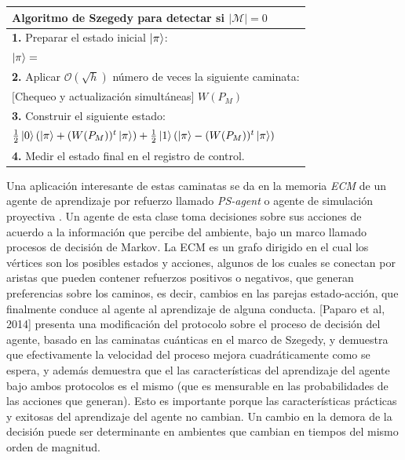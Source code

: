 \begin{center}
    \begin{tabular}{l}
    \hline \textbf{Algoritmo de Szegedy} para detectar \textbf{si $|\mathcal{M}|=0$}\\\hline 
    \textbf{1.} Preparar el estado inicial $\ket{\pi}$:\\
    $\ket{\pi}=$\\
    \textbf{2.} Aplicar $\mathcal{O}(\sqrt{h})$ número de veces la siguiente caminata:\\
    $[$Chequeo y actualización simultáneas$]$ $W(P_M)$\\
    \textbf{3.} Construir el siguiente estado:\\
    $\frac{1}{2}\ket{0}(\ket{\pi}+(W(P_M))^t\ket{\pi})+\frac{1}{2}\ket{1}(\ket{\pi}-(W(P_M))^t\ket{\pi})$\\
    \textbf{4.} Medir el estado final en el registro de control.\\\hline
    \end{tabular}{}
\end{center}{}

Una aplicación interesante de estas caminatas se da en la memoria \textit{ECM} de un agente de aprendizaje por refuerzo llamado \textit{PS-agent} o agente de simulación proyectiva \cite{briegel2012projective}. Un agente de esta clase toma decisiones sobre sus acciones de acuerdo a la información que percibe del ambiente, bajo un marco llamado procesos de decisión de Markov. La ECM es un grafo dirigido en el cual los vértices son los posibles estados y acciones, algunos de los cuales se conectan por aristas que pueden contener refuerzos positivos o negativos, que generan preferencias sobre los caminos, es decir, cambios en las parejas estado-acción, que finalmente conduce al agente al aprendizaje de alguna conducta. 
[Paparo et al, 2014]  presenta una modificación del protocolo sobre el proceso de decisión del agente, basado en las caminatas cuánticas en el marco de Szegedy, y demuestra que efectivamente la velocidad del proceso mejora cuadráticamente como se espera, y además demuestra que el las características del aprendizaje del agente bajo ambos protocolos es el mismo (que es mensurable en las probabilidades de las acciones que generan). Esto es importante porque las características prácticas y exitosas del aprendizaje del agente no cambian. Un cambio en la demora de la decisión puede ser determinante en ambientes que cambian en tiempos del mismo orden de magnitud.


